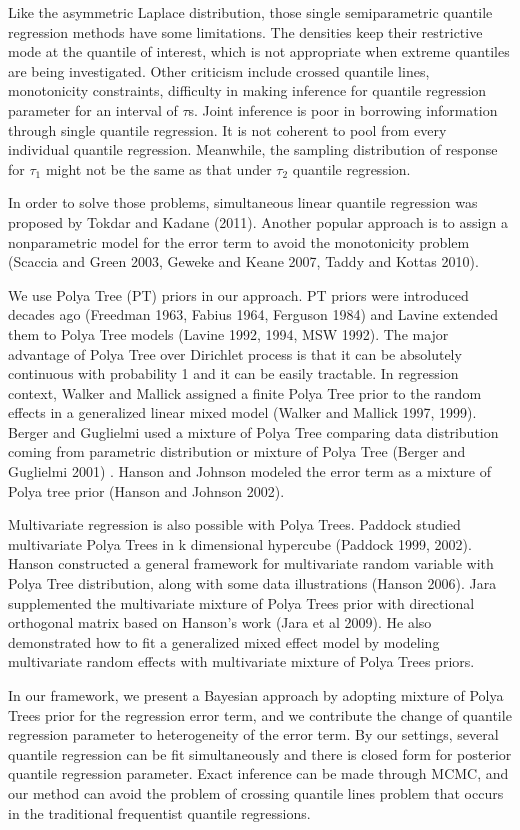 \documentclass[12pt]{article}
\begin{document}
Like the asymmetric Laplace distribution, those single semiparametric
quantile regression  methods
have some limitations. The densities keep their restrictive mode at
the quantile of interest, which is not appropriate when extreme
quantiles are being investigated. Other criticism include crossed
quantile lines, monotonicity constraints, difficulty in making
inference for quantile regression parameter for an interval of
$\tau$s. Joint inference is poor in borrowing information through
single quantile regression. It is not coherent to pool from every
individual quantile regression. Meanwhile, the sampling distribution
of response for $\tau_1$ might not be the same as that under $\tau_2$
quantile regression.

In order to solve those problems, simultaneous linear quantile
regression was proposed by Tokdar and Kadane (2011). 
Another popular approach is to assign a nonparametric model for the
error term to avoid the monotonicity problem (Scaccia and Green 2003,
Geweke and Keane 2007, Taddy and Kottas 2010).

We use Polya Tree (PT) priors in our approach. PT priors were introduced
decades ago (Freedman 1963, Fabius 1964, Ferguson 1984) and  Lavine
extended them to Polya Tree models (Lavine 1992, 1994, MSW 1992). The
major advantage of 
Polya Tree over Dirichlet process is that it can be absolutely
continuous with probability 1 and it can be easily tractable. In
regression context, Walker and Mallick assigned a finite Polya Tree
prior to the random effects in a generalized linear mixed model
(Walker and Mallick 1997, 1999). Berger and Guglielmi used a mixture
of Polya Tree comparing data distribution coming from parametric
distribution or mixture of Polya Tree (Berger and Guglielmi 2001)
. Hanson and Johnson modeled the error term as a mixture of Polya tree
prior (Hanson and Johnson 2002). 

Multivariate regression is also possible with Polya Trees. Paddock
studied multivariate Polya Trees in k dimensional hypercube (Paddock 1999,
2002). Hanson constructed a general framework for multivariate random
variable with Polya Tree distribution, along with some data
illustrations (Hanson 2006). Jara supplemented the multivariate
mixture of Polya Trees prior with directional orthogonal matrix based
on Hanson's work (Jara et al 2009). He also demonstrated how to fit a
generalized mixed effect model by modeling multivariate random effects
with multivariate mixture of Polya Trees priors. 

In our framework, we present a Bayesian approach by adopting mixture
of Polya Trees prior for the regression error term, and we contribute
the change of quantile regression parameter to heterogeneity of the
error term. By our settings, several quantile regression can be fit
simultaneously and there is closed form for  posterior quantile
regression parameter. Exact inference can be made through MCMC, and
our method can avoid the problem of 
crossing quantile lines problem that occurs in the
traditional frequentist quantile regressions. 
\end{document}
